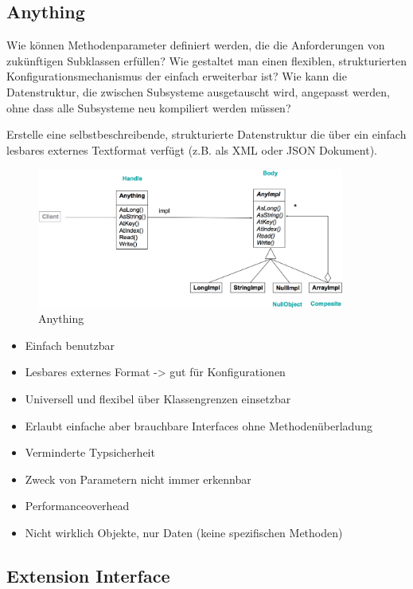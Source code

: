 \subsection{Anything}

Wie können Methodenparameter definiert werden, die die Anforderungen von zukünftigen Subklassen erfüllen? Wie gestaltet man einen flexiblen, strukturierten Konfigurationsmechanismus der einfach erweiterbar ist? Wie kann die Datenstruktur, die zwischen Subsysteme ausgetauscht wird, angepasst werden, ohne dass alle Subsysteme neu kompiliert werden müssen?

Erstelle eine selbstbeschreibende, strukturierte Datenstruktur die über ein einfach lesbares externes Textformat verfügt (z.B. als XML oder JSON Dokument).

\begin{figure}[H]
	\centering
	\includegraphics[width=0.9\textwidth]{content/advancedPatterns/anything.png}
	\caption{Anything}
\end{figure}

\begin{itemize}
	\item Einfach benutzbar
	\item Lesbares externes Format -> gut für Konfigurationen
	\item Universell und flexibel über Klassengrenzen einsetzbar
	\item Erlaubt einfache aber brauchbare Interfaces ohne Methodenüberladung
	\item Verminderte Typsicherheit
	\item Zweck von Parametern nicht immer erkennbar
	\item Performanceoverhead
	\item Nicht wirklich Objekte, nur Daten (keine spezifischen Methoden)
\end{itemize}

\subsection{Extension Interface}

